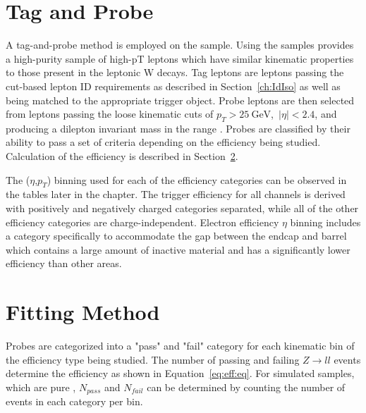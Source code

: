 % 
% 


\section{Tag and Probe}\label{ch:eff:tagandprobe}
A tag-and-probe method is employed on the \zll sample. Using the \zll samples provides a high-purity sample of high-pT leptons which have similar kinematic properties to those present in the leptonic W decays. Tag leptons are leptons passing the cut-based lepton ID requirements as described in Section~\ref{ch:IdIso} as well as being matched to the appropriate trigger object. Probe leptons are then selected from leptons passing the loose kinematic cuts of $p_T > 25 \mathrm{~GeV}$,~$|\eta|<2.4$, and producing a dilepton invariant mass in the range \masswindow. Probes are classified by their ability to pass a set of criteria depending on the efficiency being studied. Calculation of the efficiency is described in Section~\ref{ch:eff:fitting}.

The ($\eta$,$p_T$) binning used for each of the efficiency categories can be observed in the tables later in the chapter. The trigger efficiency for all channels is derived with positively and negatively charged categories separated, while all of the other efficiency categories are charge-independent. Electron efficiency $\eta$ binning includes a category specifically to accommodate the gap between the endcap and barrel which contains a large amount of inactive material and has a significantly lower efficiency than other areas.




\section{Fitting Method}\label{ch:eff:fitting}
Probes are categorized into a "pass" and "fail" category for each kinematic bin of the efficiency type being studied. The number of passing and failing $Z\rightarrow ll$ events determine the efficiency as shown in Equation~\ref{eq:eff:eq}. For simulated samples, which are pure \zll, $N_{pass}$ and $N_{fail}$ can be determined by counting the number of events in each category per bin. 

